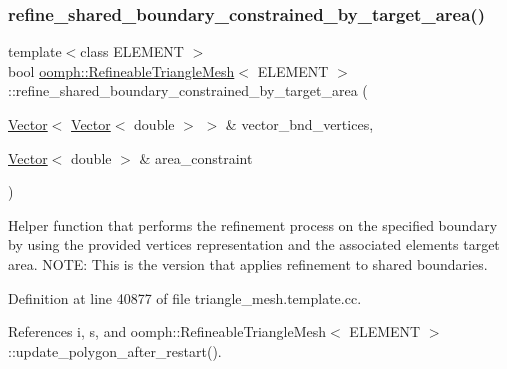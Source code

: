 \mbox{\label{classoomph_1_1RefineableTriangleMesh_adf7951948c93e9b0f259a7a05c15f1c5}} 
\subsubsection{\texorpdfstring{refine\+\_\+shared\+\_\+boundary\+\_\+constrained\+\_\+by\+\_\+target\+\_\+area()}{refine\_shared\_boundary\_constrained\_by\_target\_area()}}
{\footnotesize\ttfamily template$<$class E\+L\+E\+M\+E\+NT $>$ \\
bool \hyperlink{classoomph_1_1RefineableTriangleMesh}{oomph\+::\+Refineable\+Triangle\+Mesh}$<$ E\+L\+E\+M\+E\+NT $>$\+::refine\+\_\+shared\+\_\+boundary\+\_\+constrained\+\_\+by\+\_\+target\+\_\+area (\begin{DoxyParamCaption}\item[{\hyperlink{classoomph_1_1Vector}{Vector}$<$ \hyperlink{classoomph_1_1Vector}{Vector}$<$ double $>$ $>$ \&}]{vector\+\_\+bnd\+\_\+vertices,  }\item[{\hyperlink{classoomph_1_1Vector}{Vector}$<$ double $>$ \&}]{area\+\_\+constraint }\end{DoxyParamCaption})\hspace{0.3cm}{\ttfamily [protected]}}



Helper function that performs the refinement process on the specified boundary by using the provided vertices representation and the associated elements target area. N\+O\+TE\+: This is the version that applies refinement to shared boundaries. 



Definition at line 40877 of file triangle\+\_\+mesh.\+template.\+cc.



References i, s, and oomph\+::\+Refineable\+Triangle\+Mesh$<$ E\+L\+E\+M\+E\+N\+T $>$\+::update\+\_\+polygon\+\_\+after\+\_\+restart().



